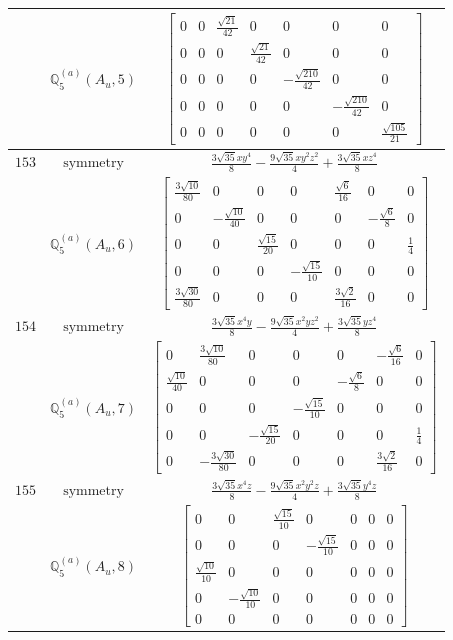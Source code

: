 \documentclass[fleqn,8pt,landscape]{jsarticle}
\begin{document}
\begin{longtable}{ccc}
$  $ & $ \mathbb{Q}_{5}^{(a)}(A_{u},5) $ & $ \begin{bmatrix} 0 & 0 & \frac{\sqrt{21}}{42} & 0 & 0 & 0 & 0 \\ 0 & 0 & 0 & \frac{\sqrt{21}}{42} & 0 & 0 & 0 \\ 0 & 0 & 0 & 0 & - \frac{\sqrt{210}}{42} & 0 & 0 \\ 0 & 0 & 0 & 0 & 0 & - \frac{\sqrt{210}}{42} & 0 \\ 0 & 0 & 0 & 0 & 0 & 0 & \frac{\sqrt{105}}{21} \end{bmatrix} $ \\ \hline
$ 153 $ & $ \text{symmetry} $ & $ \frac{3 \sqrt{35} x y^{4}}{8} - \frac{9 \sqrt{35} x y^{2} z^{2}}{4} + \frac{3 \sqrt{35} x z^{4}}{8} $ \\
$  $ & $ \mathbb{Q}_{5}^{(a)}(A_{u},6) $ & $ \begin{bmatrix} \frac{3 \sqrt{10}}{80} & 0 & 0 & 0 & \frac{\sqrt{6}}{16} & 0 & 0 \\ 0 & - \frac{\sqrt{10}}{40} & 0 & 0 & 0 & - \frac{\sqrt{6}}{8} & 0 \\ 0 & 0 & \frac{\sqrt{15}}{20} & 0 & 0 & 0 & \frac{1}{4} \\ 0 & 0 & 0 & - \frac{\sqrt{15}}{10} & 0 & 0 & 0 \\ \frac{3 \sqrt{30}}{80} & 0 & 0 & 0 & \frac{3 \sqrt{2}}{16} & 0 & 0 \end{bmatrix} $ \\ \hline
$ 154 $ & $ \text{symmetry} $ & $ \frac{3 \sqrt{35} x^{4} y}{8} - \frac{9 \sqrt{35} x^{2} y z^{2}}{4} + \frac{3 \sqrt{35} y z^{4}}{8} $ \\
$  $ & $ \mathbb{Q}_{5}^{(a)}(A_{u},7) $ & $ \begin{bmatrix} 0 & \frac{3 \sqrt{10}}{80} & 0 & 0 & 0 & - \frac{\sqrt{6}}{16} & 0 \\ \frac{\sqrt{10}}{40} & 0 & 0 & 0 & - \frac{\sqrt{6}}{8} & 0 & 0 \\ 0 & 0 & 0 & - \frac{\sqrt{15}}{10} & 0 & 0 & 0 \\ 0 & 0 & - \frac{\sqrt{15}}{20} & 0 & 0 & 0 & \frac{1}{4} \\ 0 & - \frac{3 \sqrt{30}}{80} & 0 & 0 & 0 & \frac{3 \sqrt{2}}{16} & 0 \end{bmatrix} $ \\ \hline
$ 155 $ & $ \text{symmetry} $ & $ \frac{3 \sqrt{35} x^{4} z}{8} - \frac{9 \sqrt{35} x^{2} y^{2} z}{4} + \frac{3 \sqrt{35} y^{4} z}{8} $ \\
$  $ & $ \mathbb{Q}_{5}^{(a)}(A_{u},8) $ & $ \begin{bmatrix} 0 & 0 & \frac{\sqrt{15}}{10} & 0 & 0 & 0 & 0 \\ 0 & 0 & 0 & - \frac{\sqrt{15}}{10} & 0 & 0 & 0 \\ \frac{\sqrt{10}}{10} & 0 & 0 & 0 & 0 & 0 & 0 \\ 0 & - \frac{\sqrt{10}}{10} & 0 & 0 & 0 & 0 & 0 \\ 0 & 0 & 0 & 0 & 0 & 0 & 0 \end{bmatrix} $ \\ \hline

\end{longtable}
\end{document}
